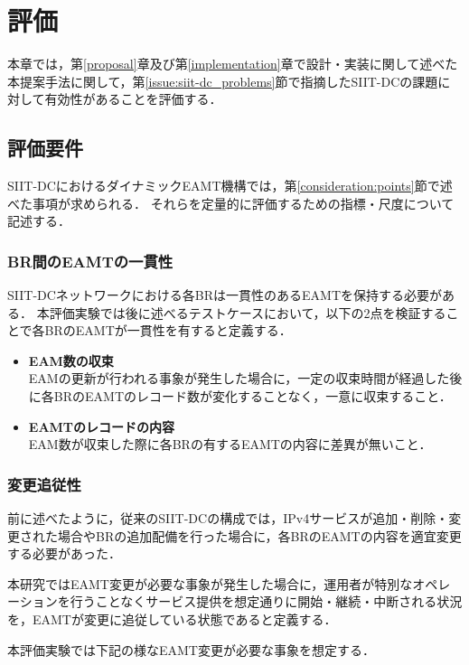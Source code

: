\chapter{評価}
\label{evaluation}
本章では，第\ref{proposal}章及び第\ref{implementation}章で設計・実装に関して述べた本提案手法に関して，第\ref{issue:siit-dc_problems}節で指摘したSIIT-DCの課題に対して有効性があることを評価する．



\section{評価要件}
\label{evaluation:requirements}
SIIT-DCにおけるダイナミックEAMT機構では，第\ref{consideration:points}節で述べた事項が求められる．
それらを定量的に評価するための指標・尺度について記述する．


\subsection{BR間のEAMTの一貫性}
\label{evaluation:requirements:consistency}

SIIT-DCネットワークにおける各BRは一貫性のあるEAMTを保持する必要がある．
本評価実験では後に述べるテストケースにおいて，以下の2点を検証することで各BRのEAMTが一貫性を有すると定義する．
\begin{itemize}
    \item \textbf{EAM数の収束} \\
    EAMの更新が行われる事象が発生した場合に，一定の収束時間が経過した後に各BRのEAMTのレコード数が変化することなく，一意に収束すること．
    \item \textbf{EAMTのレコードの内容} \\
    EAM数が収束した際に各BRの有するEAMTの内容に差異が無いこと．
\end{itemize}

\subsection{変更追従性}
\label{evaluation:requirements:change}
前に述べたように，従来のSIIT-DCの構成では，IPv4サービスが追加・削除・変更された場合やBRの追加配備を行った場合に，各BRのEAMTの内容を適宜変更する必要があった．

本研究ではEAMT変更が必要な事象が発生した場合に，運用者が特別なオペレーションを行うことなくサービス提供を想定通りに開始・継続・中断される状況を，EAMTが変更に追従している状態であると定義する．

本評価実験では下記の様なEAMT変更が必要な事象を想定する．

